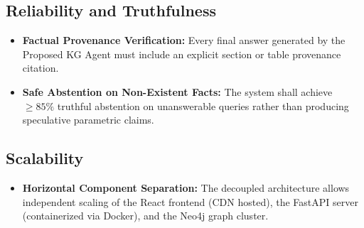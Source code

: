 \documentclass[12pt,a4paper,oneside]{report}
\begin{document}
\subsection{Reliability and Truthfulness}
\begin{itemize}
    \item \textbf{Factual Provenance Verification:} Every final answer generated by the Proposed KG Agent must include an explicit section or table provenance citation.
    \item \textbf{Safe Abstention on Non-Existent Facts:} The system shall achieve $\ge 85\%$ truthful abstention on unanswerable queries rather than producing speculative parametric claims.
\end{itemize}

\subsection{Scalability}
\begin{itemize}
    \item \textbf{Horizontal Component Separation:} The decoupled architecture allows independent scaling of the React frontend (CDN hosted), the FastAPI server (containerized via Docker), and the Neo4j graph cluster.
\end{itemize}
\end{document}

